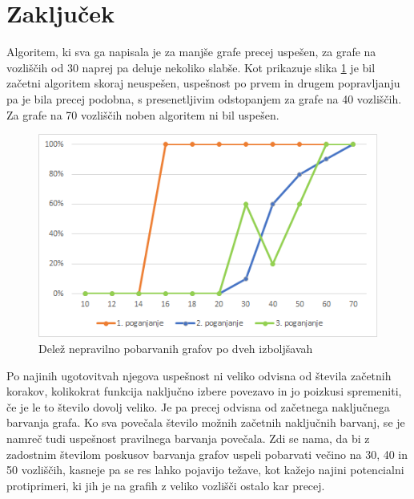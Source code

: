 \documentclass[12pt, a4paper]{article}
\begin{document}
\newpage
\section{Zaključek}
Algoritem, ki sva ga napisala je za manjše grafe precej uspešen, za grafe na vozliščih od 30 naprej pa deluje nekoliko slabše. Kot prikazuje slika \ref{fig:nepravilni_konec} je bil začetni algoritem skoraj neuspešen, uspešnost po prvem in drugem popravljanju pa je bila precej podobna, s presenetljivim odstopanjem za grafe na 40 vozliščih. Za grafe na 70 vozliščih noben algoritem ni bil uspešen.

\begin{figure}[H]
  \includegraphics[width=\linewidth]{stevilo_nepravilnih_3_poganjanja.png}
  \caption{Delež nepravilno pobarvanih grafov po dveh izboljšavah}
  \label{fig:nepravilni_konec}
\end{figure}


Po najinih ugotovitvah njegova uspešnost ni veliko odvisna od števila začetnih korakov, kolikokrat funkcija naključno izbere povezavo in jo poizkusi spremeniti, če je le to število dovolj veliko. Je pa precej odvisna od začetnega naključnega barvanja grafa. Ko sva povečala število možnih začetnih naključnih barvanj, se je namreč tudi uspešnost pravilnega barvanja povečala. Zdi se nama, da bi z zadostnim številom poskusov barvanja grafov uspeli pobarvati večino na 30, 40 in 50 vozliščih, kasneje pa se res lahko pojavijo težave, kot kažejo najini potencialni protiprimeri, ki jih je na grafih z veliko vozlišči ostalo kar precej.
\end{document}
